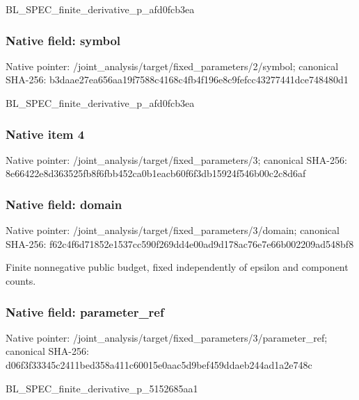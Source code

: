 \documentclass[10pt,a4paper]{article}
\begin{document}
\begingroup\raggedright\sloppy BL\_\allowbreak{}SPEC\_\allowbreak{}finite\_\allowbreak{}derivative\_\allowbreak{}p\_\allowbreak{}afd0fcb3ea\par\endgroup

\subsubsection{Native field: symbol}
Native pointer: /joint\_\allowbreak{}analysis/target/fixed\_\allowbreak{}parameters/2/symbol; canonical SHA-256: b3daae27ea656aa19f7588c4168c4fb4f196e8c9fefcc43277441dce748480d1

\begingroup\raggedright\sloppy BL\_\allowbreak{}SPEC\_\allowbreak{}finite\_\allowbreak{}derivative\_\allowbreak{}p\_\allowbreak{}afd0fcb3ea\par\endgroup

\subsubsection{Native item 4}
Native pointer: /joint\_\allowbreak{}analysis/target/fixed\_\allowbreak{}parameters/3; canonical SHA-256: 8e66422e8d363525fb8f6fbb452ca0b1eacb60f6f3db15924f546b00c2c8d6af

\subsubsection{Native field: domain}
Native pointer: /joint\_\allowbreak{}analysis/target/fixed\_\allowbreak{}parameters/3/domain; canonical SHA-256: f62c4f6d71852e1537cc590f269dd4e00ad9d178ac76e7e66b002209ad548bf8

\begingroup\raggedright\sloppy Finite nonnegative public budget,\allowbreak{} fixed independently of epsilon and component counts.\par\endgroup

\subsubsection{Native field: parameter\_\allowbreak{}ref}
Native pointer: /joint\_\allowbreak{}analysis/target/fixed\_\allowbreak{}parameters/3/parameter\_\allowbreak{}ref; canonical SHA-256: d06f3f33345c2411bed358a411c60015e0aac5d9bef459ddaeb244ad1a2e748c

\begingroup\raggedright\sloppy BL\_\allowbreak{}SPEC\_\allowbreak{}finite\_\allowbreak{}derivative\_\allowbreak{}p\_\allowbreak{}5152685aa1\par\endgroup
\end{document}
